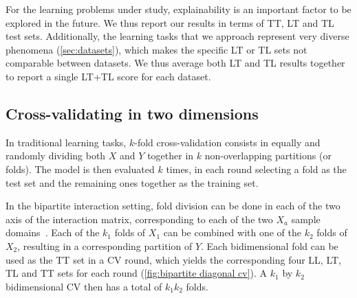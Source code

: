 
For the learning problems under study, explainability is an important factor to be explored in the future. We thus report our results in terms of TT, LT and TL test sets. Additionally, the learning tasks that we approach represent very diverse phenomena (\autoref{sec:datasets}), which makes the specific LT or TL sets not comparable between datasets. We thus average both LT and TL results together to report a single LT+TL score for each dataset.




\subsection{Cross-validating in two dimensions}
\label{sec:cross_validation}

In traditional learning tasks, $k$-fold cross-validation consists in equally and randomly dividing both $X$ and $Y$ together in $k$ non-overlapping partitions (or folds). The model is then evaluated $k$ times, in each round selecting a fold as the test set and the remaining ones together as the training set.

In the bipartite interaction setting, fold division can be done in each of the two axis of the interaction matrix, corresponding to each of the two $X_a$ sample domains~\cite{vert2008reconstruction,pahikkala2015more}. Each of the $k_1$ folds of $X_1$ can be combined with one of the $k_2$ folds of $X_2$, resulting in a corresponding partition of $Y$. Each bidimensional fold can be used as the TT set in a CV round, which yields the corresponding four LL, LT, TL and TT sets for each round (\autoref{fig:bipartite diagonal cv}). A $k_1$ by $k_2$ bidimensional CV then has a total of $k_1k_2$ folds.

